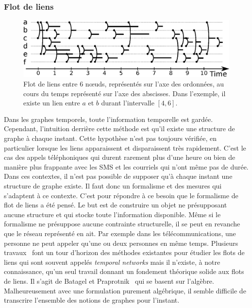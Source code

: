 \subsubsection{Flot de liens}
\begin{figure}[h]
\centering
\includegraphics[width=0.9\linewidth]{img/Intro/Flot_de_liens.eps}
\caption{Flot de liens entre $6$ n\oe{}uds, représentés sur l'axe des ordonnées, au cours du temps représenté sur l'axe des abscisses.
Dans l'exemple, il existe un lien entre $a$ et $b$ durant l'intervalle $[4,6]$.
}
\label{fig:exemple_Flot_de_liens}
\end{figure}
Dans les graphes temporels, toute l'information temporelle est gardée.
Cependant, l'intuition derrière cette méthode est qu'il existe une structure de graphe à chaque instant.
Cette hypothèse n'est pas toujours vérifiée, en particulier lorsque les liens apparaissent et disparaissent très rapidement.
C'est le cas des appels téléphoniques qui durent rarement plus d'une heure ou bien de manière plus frappante avec les SMS et les courriels qui n'ont même pas de durée.
Dans ces contextes, il n'est pas possible de supposer qu'à chaque instant une structure de graphe existe.
Il faut donc un formalisme et des mesures qui s'adaptent à ce contexte.
C'est pour répondre à ce besoin que le formalisme de flot de liens a été pensé.
Le but est de construire un objet ne présupposant aucune structure et qui stocke toute l'information disponible.
Même si le formalisme ne présuppose aucune contrainte structurelle, il se peut en revanche que le réseau représenté en ait.
Par exemple dans les télécommunications, une personne ne peut appeler qu'une ou deux personnes en même temps.
Plusieurs travaux~\cite{Holme2013a,Holme2015b,Holme2015e} font un tour d'horizon des méthodes existantes pour étudier les flots de liens qui sont souvent appelés \emph{temporal networks} mais il n'existe, à notre connaissance, qu'un seul travail donnant un fondement théorique solide aux flots de liens.
Il s'agit de Batagel et Praprotnik~\cite{Batagelj2016} qui se basent sur l'algèbre.
Malheureusement avec une formulation purement algébrique, il semble difficile de transcrire l'ensemble des notions de graphes pour l'instant.
\bigskip


